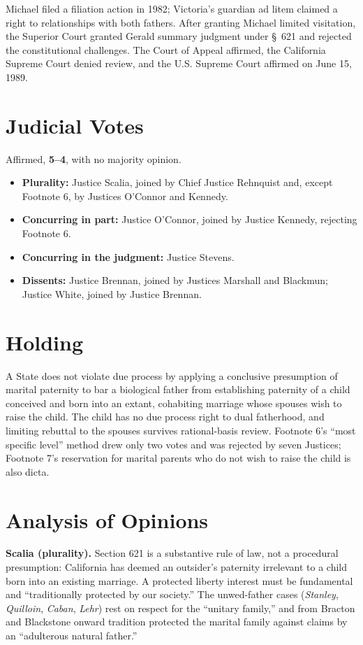 \documentclass[12pt]{article}
\begin{document}
Michael filed a filiation action in 1982; Victoria's guardian ad litem claimed a right to relationships with both fathers. After granting Michael limited visitation, the Superior Court granted Gerald summary judgment under \S~621 and rejected the constitutional challenges. The Court of Appeal affirmed, the California Supreme Court denied review, and the U.S. Supreme Court affirmed on June 15, 1989.

\section{Judicial Votes}

Affirmed, \textbf{5--4}, with no majority opinion.
\begin{itemize}
\item \textbf{Plurality:} Justice Scalia, joined by Chief Justice Rehnquist and, except Footnote 6, by Justices O'Connor and Kennedy.
\item \textbf{Concurring in part:} Justice O'Connor, joined by Justice Kennedy, rejecting Footnote 6.
\item \textbf{Concurring in the judgment:} Justice Stevens.
\item \textbf{Dissents:} Justice Brennan, joined by Justices Marshall and Blackmun; Justice White, joined by Justice Brennan.
\end{itemize}

\section{Holding}

A State does not violate due process by applying a conclusive presumption of marital paternity to bar a biological father from establishing paternity of a child conceived and born into an extant, cohabiting marriage whose spouses wish to raise the child. The child has no due process right to dual fatherhood, and limiting rebuttal to the spouses survives rational-basis review. Footnote 6's ``most specific level'' method drew only two votes and was rejected by seven Justices; Footnote 7's reservation for marital parents who do not wish to raise the child is also dicta.

\section{Analysis of Opinions}

\textbf{Scalia (plurality).} Section 621 is a substantive rule of law, not a procedural presumption: California has deemed an outsider's paternity irrelevant to a child born into an existing marriage. A protected liberty interest must be fundamental and ``traditionally protected by our society.'' The unwed-father cases (\textit{Stanley}, \textit{Quilloin}, \textit{Caban}, \textit{Lehr}) rest on respect for the ``unitary family,'' and from Bracton and Blackstone onward tradition protected the marital family against claims by an ``adulterous natural father.''
\end{document}

